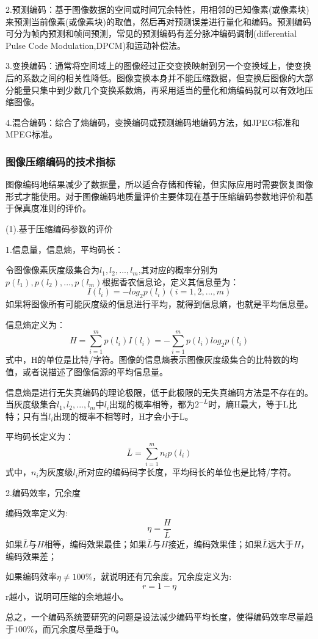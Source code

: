 \documentclass[11pt]{article}
\begin{document}
2.预测编码：基于图像数据的空间或时间冗余特性，用相邻的已知像素(或像素块)来预测当前像素(或像素块)的取值，然后再对预测误差进行量化和编码。预测编码可分为帧内预测和帧间预测，常见的预测编码有差分脉冲编码调制(differential Pulse Code Modulation,DPCM)和运动补偿法。

3.变换编码：通常将空间域上的图像经过正交变换映射到另一个变换域上，使变换后的系数之间的相关性降低。图像变换本身并不能压缩数据，但变换后图像的大部分能量只集中到少数几个变换系数熵，再采用适当的量化和熵编码就可以有效地压缩图像。

4.混合编码：综合了熵编码，变换编码或预测编码地编码方法，如JPEG标准和MPEG标准。

\subsubsection{图像压缩编码的技术指标}
图像编码地结果减少了数据量，所以适合存储和传输，但实际应用时需要恢复图像形式才能使用。对于图像编码地质量评价主要体现在基于压缩编码参数地评价和基于保真度准则的评价。

(1).基于压缩编码参数的评价

1.信息量，信息熵，平均码长：

令图像像素灰度级集合为${l_1,l_2,...,l_m}$,其对应的概率分别为$p(l_1),p(l_2),...,p(l_m)$根据香农信息论，定义其信息量为：
$$I(l_i) = -log_2p(l_i) (i=1,2,...,m)$$
如果将图像所有可能灰度级的信息进行平均，就得到信息熵，也就是平均信息量。

信息熵定义为：
$$H = \sum_{i=1}^{m}p(l_i)I(l_i) = -\sum_{i=1}^{m}p(l_i)log_2p(l_i)$$
式中，H的单位是比特/字符。图像的信息熵表示图像灰度级集合的比特数的均值，或者说描述了图像信源的平均信息量。

信息熵是进行无失真编码的理论极限，低于此极限的无失真编码方法是不存在的。当灰度级集合${l_1,l_2,...,l_m}$中$l_i$出现的概率相等，都为$2^{-L}$时，熵H最大，等于L比特；只有当$l_i$出现的概率不相等时，H才会小于L。

平均码长定义为：
$$\bar{L} = \sum_{i=1}^{m}n_ip(l_i)$$
式中，$n_i$为灰度级$l_i$所对应的编码码字长度，平均码长的单位也是比特/字符。

2.编码效率，冗余度

编码效率定义为:
$$ \eta = \frac{H}{\bar{L}}$$
如果$\bar{L}$与$H$相等，编码效果最佳；如果$\bar{L}$与$H$接近，编码效果佳；如果$\bar{L}$远大于$H$，编码效果差；

如果编码效率$\eta \neq 100\%$，就说明还有冗余度。冗余度定义为:
$$r = 1 - \eta$$
r越小，说明可压缩的余地越小。

总之，一个编码系统要研究的问题是设法减少编码平均长度，使得编码效率尽量趋于$100\%$，而冗余度尽量趋于0。
\end{document}
